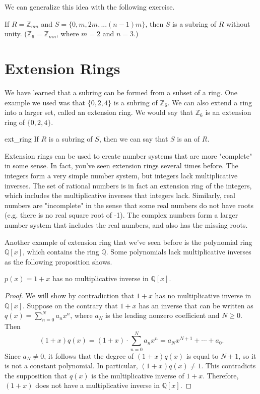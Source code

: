 We can generalize this idea with the following exercise.

\begin{exercise}{}
If $R={\mathbb Z}_{mn}$ and $S=\{0,m,2m,...(n-1)m\}$, then $S$ is a subring of $R$ without unity. (${\mathbb Z}_6={\mathbb Z}_{mn}$, where $m=2$ and $n=3$.)  
\end{exercise}

\section{Extension Rings}
\label{sec:Rings:ExtensionRings}

We have learned that a subring can be formed from a subset of a ring. One example we used was that $\{0,2,4\}$ is a subring of ${\mathbb Z}_6$. We can also extend a ring into a larger set, called an extension ring.  We would say that ${\mathbb Z}_6$ is an extension ring of $\{0,2,4\}$.

\begin{defn}{ext_ring}
If $R$ is a subring of $S$, then we can say that $S$ is an  of $R$.
\end{defn}

Extension rings  can be used to create number systems that are more "complete" in some sense. In fact, you've seen extension rings several times before. The integers form a very simple number system, but integers lack multiplicative inverses. The set of rational numbers is in fact an extension ring of the integers, which includes the multiplicative inverses that integers lack.  Similarly, real numbers are "incomplete" in the sense that some real numbers do not have roots (e.g. there is no real square root of -1).  The complex numbers form a larger number system that includes the real numbers, and also has the missing roots. 

Another example of extension ring that we've seen before is the polynomial ring ${\mathbb Q}[x]$, which contains the ring ${\mathbb Q}$. Some polynomials lack multiplicative inverses as the following proposition shows.

\begin{prop}{}
$p(x)=1+x$ has no multiplicative inverse in ${\mathbb Q}[x]$.

\begin{proof}
We will show by contradiction that $1 + x$ has no  multiplicative inverse in 
${\mathbb Q}[x]$. Suppose on the contrary that $1+x$ has an inverse that can be written as $q(x) = \sum_{n=0}^{N}a_nx^n$, where $a_N$ is the leading nonzero coefficient and $N \ge 0$. Then 
\begin{equation*}
(1+x)q(x) = (1+x) \cdot \sum_{n=0}^{N}a_nx^n=a_{N}x^{N+1}+\cdots+a_0.
\end{equation*}
Since $a_N \neq 0$, it follows that the degree of $(1+x)q(x)$ is equal to $N+1$, so it is not a constant polynomial.  In particular, $(1+x)q(x) \neq 1$. This contradicts the supposition that $q(x)$ is the multiplicative inverse of $1+x$. Therefore, $(1+x)$ does not have a  multiplicative inverse in ${\mathbb Q}[x]$. 
\end{proof}
\end{prop}

